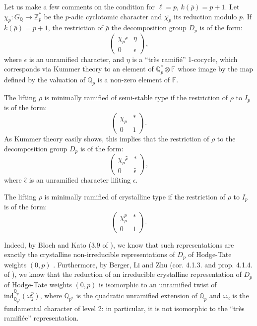 \documentclass[12pt]{article}
\newcommand{\Q}{\mathbb{Q}}
\newcommand{\Z}{\mathbb{Z}}
\newcommand{\Qp}{\mathbb{Q}_{p}}
\def\rhob{ {\bar {\rho} } }
\newcommand{\F}{{\mathbb F}}
\begin{document}
\vspace{.5cm}

Let us make a few comments on the condition for $\ell =p$,
$k(\rhob )= p +1$.
Let $\chi _p: G_{\Q}\rightarrow \Z_p ^* $
be the $p$-adic cyclotomic character and
$\overline{\chi_p}$ its reduction modulo $p$.
If $k(\rhob)= p +1$, the restriction of $\rhob$
the  decomposition group $D_{p}$ is of the form:
$$\left( \begin{array}{cc}
{\overline{\chi_p}}\epsilon & \eta  \\
    0 & \epsilon
\end{array} \right),$$
where $\epsilon$ is an unramified character, and $\eta$
is a ``tr\`es ramifi\'e'' 1-cocycle, which corresponds
via Kummer theory to an element of $\Qp ^{*}\otimes \F$
whose image by the map defined by the valuation of $\Qp$
is a non-zero element of $\F$.

The lifting $\rho$ is minimally ramified of semi-stable type if
the restriction of $\rho$
to $I_{p}$ is of the form:
$$\left( \begin{array}{cc}
    \chi_p & *  \\
    0 & 1
\end{array} \right).$$
As Kummer theory
easily shows, this implies that the restriction of $\rho$ to the
decomposition
group $D_{p}$ is of the form:
$$\left( \begin{array}{cc}
    \chi_p \widehat{\epsilon} & *  \\
    0 & \widehat{\epsilon}
\end{array} \right),$$
where $\widehat{\epsilon}$ is an unramified character lifiting $\epsilon$.

The lifting $\rho$  is minimally ramified of crystalline type if
the restriction of  $\rho$
to $I_{p}$ is of the form:
$$\left( \begin{array}{cc}
    \chi_p ^{p}& *  \\
    0 & 1
\end{array} \right).$$

Indeed, by Bloch and Kato (3.9 of \cite{[BK]}), we know that such
representations are exactly the crystalline
non-irreducible representations of $D_p$
of Hodge-Tate weights $(0,p)$ . Furthermore, by
Berger, Li and Zhu (cor. 4.1.3. and prop. 4.1.4. of
\cite{BLZ}), we know that
the reduction of an irreducible crystalline representation
of $D_{p}$ of Hodge-Tate weights $(0,p)$ is isomorphic to
an unramified twist of
$\mathrm{ind}_{\Q _{p^2}}^{\Qp }(\omega _2 ^p)$, where $\Q _{p^2}$
is the quadratic unramified extension of $\Qp$ and $\omega_2$
is the fundamental character of level $2$: in particular, it is not
isomorphic
to the ``tr\`es ramifi\'ee'' representation.
\end{document}
